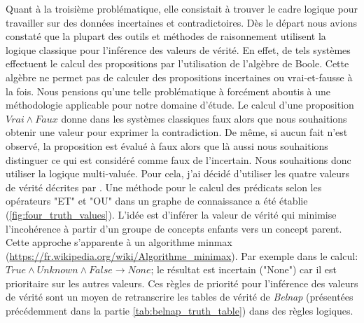 \begin{refsegment}
Quant à la troisième problématique, elle consistait à trouver le cadre logique pour travailler sur des données incertaines et contradictoires. Dès le départ nous avions constaté que la plupart des  outils et méthodes de raisonnement utilisent la logique classique pour l'inférence des valeurs de vérité. En effet, de tels systèmes effectuent le calcul des propositions par l'utilisation de l'algèbre de Boole. Cette algèbre ne permet pas de calculer des propositions incertaines ou vrai-et-fausse à la fois.  Nous pensions qu'une telle problématique à forcément aboutis à une méthodologie applicable pour notre domaine d'étude. Le calcul d'une proposition $Vrai \land Faux$ donne dans les systèmes classiques faux alors que nous souhaitions obtenir une valeur pour exprimer la contradiction. De même, si aucun fait n’est observé, la proposition est évalué à faux alors que là aussi nous souhaitions distinguer ce qui est  considéré comme faux de l'incertain. Nous souhaitions donc utiliser la logique multi-valuée. Pour cela, j’ai décidé d’utiliser les quatre valeurs de vérité décrites par \citeauthor{belnap77}\cite{belnap77}. Une méthode pour le calcul des prédicats selon les opérateurs "ET" et "OU" dans un graphe de connaissance a été établie  (\cref{fig:four_truth_values}). L'idée est d'inférer la valeur de vérité qui minimise l'incohérence à partir  d'un groupe de concepts enfants vers un concept parent. Cette approche s'apparente à un algorithme minmax \cite{aho1989} (\url{https://fr.wikipedia.org/wiki/Algorithme_minimax}). Par exemple dans le calcul: $ True \land Unknown \land False \to None$; le résultat est incertain ("None") car il est prioritaire sur les autres valeurs. Ces règles de priorité pour l'inférence des valeurs de vérité sont un moyen de retranscrire les tables de vérité de \textit{Belnap} (présentées précédemment dans la partie  \cref{tab:belnap_truth_table}) dans des règles logiques.


\end{refsegment}
